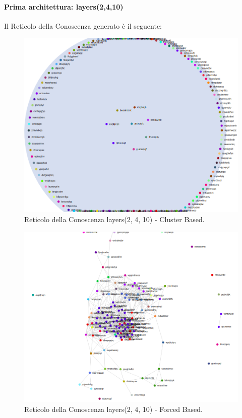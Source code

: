 \paragraph{Prima architettura: layers(2,4,10)}\mbox{}
\label{Prima architettura}
\noindent
Il Reticolo della Conoscenza generato è il seguente:
\begin{figure}[H]
\centering
	\includegraphics[width=0.70\linewidth]{./image/sql(2,4,10).png}
	\caption{Reticolo della Conoscenza layers(2, 4, 10) - Cluster Based.}
	\label{Reticolo della Conoscenza layers(2, 4, 10) - Cluster Based.}
\end{figure}
\noindent
\begin{figure}[H]
\centering
	\includegraphics[width=0.70\linewidth]{./image/sql(2,4,10)_forced.png}
	\caption{Reticolo della Conoscenza layers(2, 4, 10) - Forced Based.}
	\label{Reticolo della Conoscenza layers(2, 4, 10) - Forced Based.}
\end{figure}
\noindent

